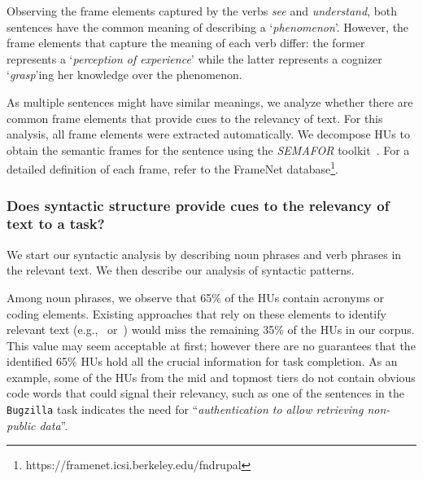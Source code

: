 \medskip



Observing the frame elements captured by the verbs \textit{see} and
\textit{understand}, both sentences have the common meaning of
describing a `\textit{phenomenon}'.
However, the frame elements
that capture the meaning of each verb differ: the former represents a
`\textit{perception of experience}' while the latter represents a
cognizer `\textit{grasp}'ing her knowledge over the 
phenomenon. 


As multiple sentences might have similar meanings,
we analyze whether there are common frame elements 
that provide cues to the relevancy of text.
For this analysis, all frame elements were extracted automatically.
We decompose HUs to obtain the semantic frames for the sentence 
using the \textit{SEMAFOR} toolkit~\cite{das2014frame}.
For a detailed definition of each frame, refer to
the FrameNet
database\footnote{https://framenet.icsi.berkeley.edu/fndrupal}.




\subsubsection{Does syntactic structure provide cues to the relevancy of text to a task?}
\label{cp3:syntactic-analysis}



We start our syntactic analysis by describing noun phrases and verb phrases
in the relevant text. 
We then describe our analysis of syntactic patterns.  



Among noun phrases, we observe that 65\% of the HUs contain acronyms or coding elements.
Existing approaches that rely on these elements to identify relevant text (e.g.,~\cite{Robillard2015} or~\cite{Jiang2016b}) would miss the remaining 35\% of the HUs in our corpus.
This value may seem acceptable at first; however there are no guarantees that
the identified 65\% HUs hold all the crucial information for task completion.
As an example, some of the HUs from the mid and topmost tiers 
do not contain obvious code words that could signal their relevancy,
such as one of the sentences in the \texttt{Bugzilla} task indicates the need for ``\textit{authentication to allow retrieving non-public data}''.





